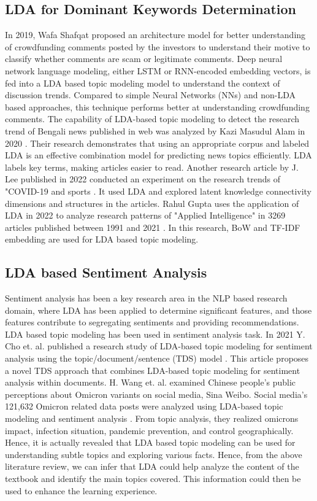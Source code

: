 \documentclass[sn-mathphys,Numbered]{sn-jnl}%
\theoremstyle{thmstyleone}%
\theoremstyle{thmstyletwo}%
\theoremstyle{thmstylethree}%
\begin{document}
\subsection{LDA for Dominant Keywords Determination}\label{dom_lda} 
In 2019, Wafa Shafqat \cite{shafqat2019topic} proposed an architecture model for better understanding of crowdfunding comments posted by the investors to understand their motive to classify whether comments are scam or legitimate comments. Deep neural network language modeling, either LSTM or RNN-encoded embedding vectors, is fed into a LDA based topic modeling model to understand the context of discussion trends. Compared to simple Neural Networks (NNs) and non-LDA based approaches, this technique performs better at understanding crowdfunding comments. The capability of LDA-based topic modeling to detect the research trend of Bengali news published in web was analyzed by Kazi Masudul Alam in 2020 \cite{alam_bangla_2020}. Their research demonstrates that using an appropriate corpus and labeled LDA is an effective combination model for predicting news topics efficiently. LDA labels key terms, making articles easier to read. Another research article by J. Lee published in 2022 conducted an experiment on the research trends of "COVID-19 and sports \cite{lee_lda_based_2022}. It used LDA and explored latent knowledge connectivity dimensions and structures in the articles. Rahul Gupta uses the application of LDA in 2022 to analyze research patterns of "Applied Intelligence" in 3269 articles published between 1991 and 2021 \cite{gupta_prediction_2022}. In this research, BoW and TF-IDF embedding are used for LDA based topic modeling. 

\subsection{LDA based Sentiment Analysis}\label{sent_lda} 
Sentiment analysis has been a key research area in the NLP based research domain, where LDA has been applied to determine significant features, and those features contribute to segregating sentiments and providing recommendations. LDA based topic modeling has been used in sentiment analysis task. In 2021 Y. Cho et. al. published a research study of LDA-based topic modeling for sentiment analysis using the topic/document/sentence (TDS) model \cite{farkhod_lda_based_2021}. This article proposes a novel TDS approach that combines LDA-based topic modeling for sentiment analysis within documents. H. Wang et. al. examined Chinese people's public perceptions about Omicron variants on social media, Sina Weibo. Social media's 121,632 Omicron related data posts were analyzed using LDA-based topic modeling and sentiment analysis \cite{wang_exploring_2022}. From topic analysis, they realized omicron\textquotesingle s impact, infection situation, pandemic prevention, and control geographically. Hence, it is actually revealed that LDA based topic modeling can be used for understanding subtle topics and exploring various facts. Hence, from the above literature review, we can infer that LDA could help analyze the content of the textbook and identify the main topics covered. This information could then be used to enhance the learning experience. 
\end{document}
